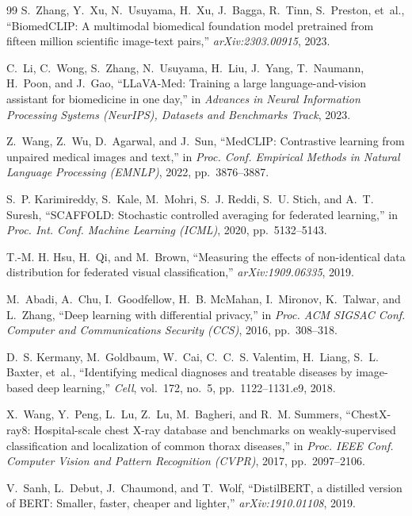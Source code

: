 \documentclass[letterpaper, conference]{IEEEtran}
\begin{document}
\begin{thebibliography}{99}
S.~Zhang, Y.~Xu, N.~Usuyama, H.~Xu, J.~Bagga, R.~Tinn, S.~Preston, et~al.,
``BiomedCLIP: A multimodal biomedical foundation model pretrained from fifteen
million scientific image-text pairs,'' \emph{arXiv:2303.00915}, 2023.

C.~Li, C.~Wong, S.~Zhang, N.~Usuyama, H.~Liu, J.~Yang, T.~Naumann, H.~Poon, and J.~Gao,
``LLaVA-Med: Training a large language-and-vision assistant for biomedicine in one day,''
in \emph{Advances in Neural Information Processing Systems (NeurIPS), Datasets and
Benchmarks Track}, 2023.

Z.~Wang, Z.~Wu, D.~Agarwal, and J.~Sun,
``MedCLIP: Contrastive learning from unpaired medical images and text,''
in \emph{Proc. Conf. Empirical Methods in Natural Language Processing (EMNLP)},
2022, pp.~3876--3887.

S.~P. Karimireddy, S.~Kale, M.~Mohri, S.~J. Reddi, S.~U. Stich, and A.~T. Suresh,
``SCAFFOLD: Stochastic controlled averaging for federated learning,''
in \emph{Proc. Int. Conf. Machine Learning (ICML)}, 2020, pp.~5132--5143.

T.-M. H. Hsu, H.~Qi, and M.~Brown,
``Measuring the effects of non-identical data distribution for federated visual
classification,'' \emph{arXiv:1909.06335}, 2019.

M.~Abadi, A.~Chu, I.~Goodfellow, H.~B. McMahan, I.~Mironov, K.~Talwar, and L.~Zhang,
``Deep learning with differential privacy,''
in \emph{Proc. ACM SIGSAC Conf. Computer and Communications Security (CCS)}, 2016,
pp.~308--318.

D.~S. Kermany, M.~Goldbaum, W.~Cai, C.~C.~S. Valentim, H.~Liang, S.~L. Baxter,
et~al., ``Identifying medical diagnoses and treatable diseases by image-based
deep learning,'' \emph{Cell}, vol.~172, no.~5, pp.~1122--1131.e9, 2018.

X.~Wang, Y.~Peng, L.~Lu, Z.~Lu, M.~Bagheri, and R.~M. Summers,
``ChestX-ray8: Hospital-scale chest X-ray database and benchmarks on
weakly-supervised classification and localization of common thorax diseases,''
in \emph{Proc. IEEE Conf. Computer Vision and Pattern Recognition (CVPR)}, 2017,
pp.~2097--2106.

V.~Sanh, L.~Debut, J.~Chaumond, and T.~Wolf,
``DistilBERT, a distilled version of BERT: Smaller, faster, cheaper and
lighter,'' \emph{arXiv:1910.01108}, 2019.


\end{thebibliography}
\end{document}
